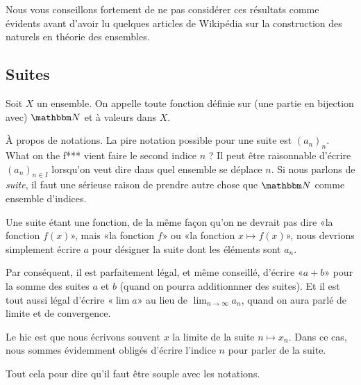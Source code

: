 Nous vous conseillons fortement de ne pas considérer ces résultats comme évidents avant d'avoir lu quelques articles de Wikipédia sur la construction des naturels en théorie des ensembles.

\subsection{Suites}

\begin{definition}
  Soit \( X \) un ensemble. On appelle  toute fonction définie sur (une partie en bijection avec) \( \eN \) et à valeurs dans \( X \).
\end{definition}

\begin{normaltext}
    À propos de notations. La pire notation possible pour une suite est \( (a_n)_n\). What on the f*** vient faire le second indice \( n\) ? Il peut être raisonnable d'écrire \( (a_n)_{n\in I}\) lorsqu'on veut dire dans quel ensemble se déplace \( n\). Si nous parlons de \emph{suite}, il faut une sérieuse raison de prendre autre chose que \( \eN\) comme ensemble d'indices.

    Une suite étant une fonction, de la même façon qu'on ne devrait pas dire «la fonction \( f(x)\)», mais «la fonction \( f\)» ou «la fonction \( x\mapsto f(x)\)», nous devrions simplement écrire \( a\) pour désigner la suite dont les éléments sont \( a_n\).

    Par conséquent, il est parfaitement légal, et même conseillé, d'écrire «\( a+b\)» pour la somme des suites \( a\) et \( b\) (quand on pourra additionnner des suites). Et il est tout aussi légal d'écrire «\( \lim a\)» au lieu de \( \lim_{n\to \infty} a_n\), quand on aura parlé de limite et de convergence.

    Le hic est que nous écrivons souvent \( x\) la limite de la suite \( n\mapsto x_n\). Dans ce cas, nous sommes évidemment obligés d'écrire l'indice \( n\) pour parler de la suite.

    Tout cela pour dire qu'il faut être souple avec les notations.
\end{normaltext}



